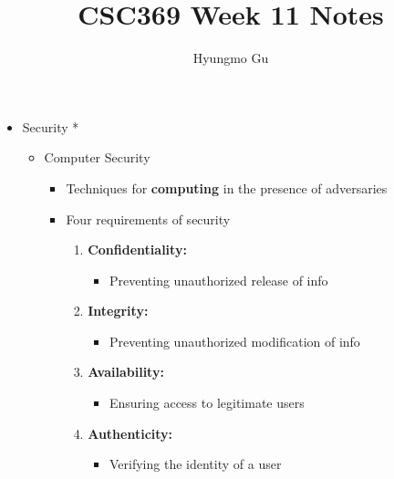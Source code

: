 \documentclass[12pt]{article}
\begin{document}
\title{CSC369 Week 11 Notes}
\author{Hyungmo Gu}
\maketitle

\begin{itemize}
    \item Security *
    \begin{itemize}
        \item Computer Security
        \begin{itemize}
            \item Techniques for \textbf{computing} in the presence of adversaries
            \item Four requirements of security
            \begin{enumerate}[1.]
                \item \textbf{Confidentiality:}
                \begin{itemize}
                    \item Preventing unauthorized release of info
                \end{itemize}
                \item \textbf{Integrity:}
                \begin{itemize}
                    \item Preventing unauthorized modification of info
                \end{itemize}
                \item \textbf{Availability:}
                \begin{itemize}
                    \item Ensuring access to legitimate users
                \end{itemize}
                \item \textbf{Authenticity:}
                \begin{itemize}
                    \item Verifying the identity of a user
                \end{itemize}
            \end{enumerate}


\end{itemize}
\end{itemize}
\end{itemize}
\end{document}
